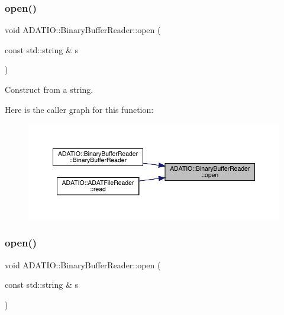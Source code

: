 \mbox{\label{classADATIO_1_1BinaryBufferReader_af56c8d00474a1f38f38267c45aa7b433}} 
\subsubsection{\texorpdfstring{open()}{open()}\hspace{0.1cm}{\footnotesize\ttfamily [1/2]}}
{\footnotesize\ttfamily void A\+D\+A\+T\+I\+O\+::\+Binary\+Buffer\+Reader\+::open (\begin{DoxyParamCaption}\item[{const std\+::string \&}]{s }\end{DoxyParamCaption})}



Construct from a string. 

Here is the caller graph for this function\+:\nopagebreak
\begin{figure}[H]
\begin{center}
\leavevmode
\includegraphics[width=350pt]{d0/df3/classADATIO_1_1BinaryBufferReader_af56c8d00474a1f38f38267c45aa7b433_icgraph}
\end{center}
\end{figure}
\mbox{\label{classADATIO_1_1BinaryBufferReader_af56c8d00474a1f38f38267c45aa7b433}} 
\subsubsection{\texorpdfstring{open()}{open()}\hspace{0.1cm}{\footnotesize\ttfamily [2/2]}}
{\footnotesize\ttfamily void A\+D\+A\+T\+I\+O\+::\+Binary\+Buffer\+Reader\+::open (\begin{DoxyParamCaption}\item[{const std\+::string \&}]{s }\end{DoxyParamCaption})}




